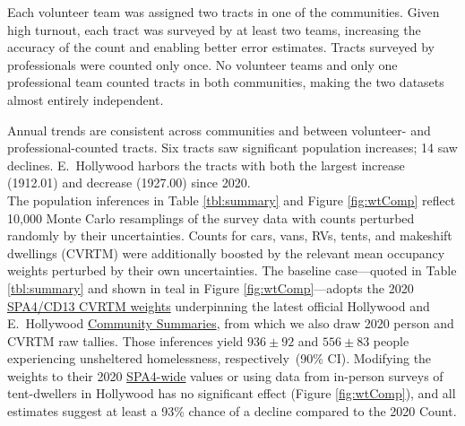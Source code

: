 \documentclass[11pt]{article}
\def\resp{respectively}
\begin{document}
Each volunteer team was assigned two tracts in one of the communities. Given high turnout, each tract was 
surveyed by at least two teams, increasing the accuracy of the count and enabling better error estimates. Tracts 
surveyed by professionals were counted only once. No volunteer teams and only one professional team counted 
tracts in both communities, making the two datasets almost entirely independent.

Annual trends are consistent across communities and between volunteer- and professional-counted tracts.
Six tracts saw significant population increases; 14 saw declines. E.~Hollywood harbors the tracts with both the
largest increase (1912.01) and decrease (1927.00) since 2020.\\

 The population inferences in Table \ref{tbl:summary} and 
Figure \ref{fig:wtComp} reflect 10,000 Monte Carlo resamplings of the survey data with 
counts perturbed randomly by their uncertainties. Counts for cars, vans, RVs, tents, and 
makeshift dwellings (CVRTM) were additionally boosted by the relevant mean occupancy weights 
perturbed by their own uncertainties. The baseline case---quoted in Table \ref{tbl:summary} and 
shown in teal in Figure \ref{fig:wtComp}---adopts the 2020 
\href{https://www.lahsa.org/documents?id=4635-usc-2018-2020-multipliers-and-estimates-overview}
{SPA4/CD13 CVRTM weights} underpinning the latest official Hollywood and E.~Hollywood 
\href{https://www.lahsa.org/documents?id=4686-2020-greater-los-angeles-city-community-homelessness-report-service-planning-area-4.pdf}
{Community Summaries}, from which we also draw 2020 person and CVRTM raw tallies. Those inferences yield 
$936\pm92$ and $556\pm83$ people experiencing unsheltered homelessness, \resp\ (90\% CI). Modifying the weights
to their 2020 \href{https://www.lahsa.org/documents?id=4693-2020-greater-los-angeles-homeless-count-cvrtm-conversion-factors}
{SPA4-wide} values or using data from in-person surveys of tent-dwellers in Hollywood has no
significant effect (Figure \ref{fig:wtComp}), and all estimates suggest at least a 93\% chance of a decline compared
to the 2020 Count.
\end{document}
